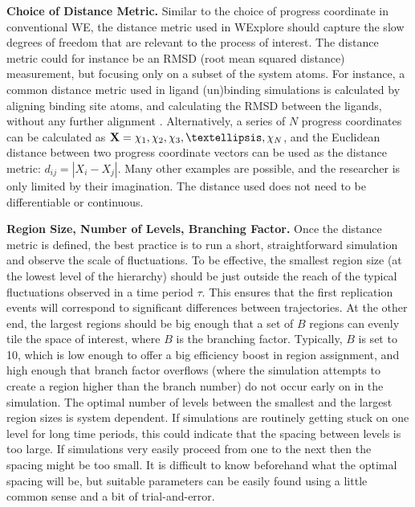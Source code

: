 \documentclass[9pt,tutorial,pubversion]{livecoms}
\begin{document}
\textbf{Choice of Distance Metric.} Similar to the choice of progress coordinate in conventional WE, the distance metric used in WExplore should capture the slow degrees of freedom that are relevant to the process of interest. 
The distance metric could for instance be an RMSD (root mean squared distance) measurement, but focusing only on a subset of the system atoms. 
For instance, a common distance metric used in ligand (un)binding simulations is calculated by aligning binding site atoms, and calculating the RMSD between the ligands, without any further alignment \citep{Dickson2016}. 
Alternatively, a series of $N$ progress coordinates can be calculated as ${\bf X} = {\chi_1, \chi_2, \chi_3, …, \chi_N}$, and the Euclidean distance between two progress coordinate vectors can be used as the distance metric: $d_{ij} = |X_i - X_j|$. 
Many other examples are possible, and the researcher is only limited by their imagination. 
The distance used does not need to be differentiable or continuous.

\textbf{Region Size, Number of Levels, Branching Factor.} Once the distance metric is defined, the best practice is to run a short, straightforward simulation and observe the scale of fluctuations.
To be effective, the smallest region size (at the lowest level of the hierarchy) should be just outside the reach of the typical fluctuations observed in a time period $\tau$. 
This ensures that the first replication events will correspond to significant differences between trajectories. 
At the other end, the largest regions should be big enough that a set of $B$ regions can evenly tile the space of interest, where $B$ is the branching factor. 
Typically, $B$ is set to 10, which is low enough to offer a big efficiency boost in region assignment, and high enough that branch factor overflows (where the simulation attempts to create a region higher than the branch number) do not occur early on in the simulation. 
The optimal number of levels between the smallest and the largest region sizes is system dependent. 
If simulations are routinely getting stuck on one level for long time periods, this could indicate that the spacing between levels is too large. 
If simulations very easily proceed from one to the next then the spacing might be too small. 
It is difficult to know beforehand what the optimal spacing will be, but suitable parameters can be easily found using a little common sense and a bit of trial-and-error.
\end{document}
